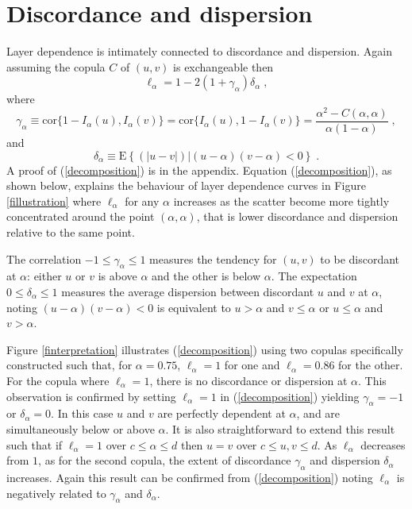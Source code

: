 \documentclass[authoryear]{elsarticle}
\newcommand{\E}{{\mathrm E}}
\newcommand{\cor}{\mathrm{cor}}
\newcommand{\eref}[1]{(\ref{#1})}
\newcommand{\fref}[1]{Figure \ref{#1}}
\begin{document}
\section{Discordance and dispersion}\label{sdecompose}

Layer dependence is intimately connected to discordance and dispersion.
Again assuming the copula $C$ of $(u,v)$ is exchangeable then
\begin{equation}\label{decomposition}
\ell_\alpha = 1-2(1+\gamma_\alpha) \delta_\alpha \;,
\end{equation}
where
$$
\gamma_\alpha \equiv \cor\{1-I_\alpha(u),I_\alpha(v)\} =\cor\{I_\alpha(u),1-I_\alpha(v)\}=\frac{\alpha^2-C(\alpha,\alpha)}{\alpha(1-\alpha)}\;,
$$
and
$$
\delta_\alpha \equiv\E\left\{(|u-v|)|(u-\alpha)(v-\alpha)<0\right\}  \; .
$$
A proof of \eref{decomposition} is  in the appendix. Equation \eref{decomposition}, as shown below, explains the behaviour of layer dependence curves in \fref{fillustration} where $\ell_\alpha$ for any $\alpha$ increases as the scatter become more tightly concentrated  around the point $(\alpha,\alpha)$, that is lower discordance and dispersion relative to the same point.

The correlation $-1\leq\gamma_\alpha\leq 1$ measures the tendency for $(u,v)$ to be discordant at $\alpha$: either $u$ or $v$ is above $\alpha$ and the other is below $\alpha$. The expectation $0\leq \delta_\alpha\leq 1$ measures the average dispersion between discordant $u$ and $v$ at $\alpha$, noting $(u-\alpha)(v-\alpha)<0$ is equivalent to $u>\alpha$ and $v\le\alpha$ or $u\le\alpha$ and $v>\alpha$.


\fref{finterpretation} illustrates \eref{decomposition} using two copulas specifically constructed such that, for $\alpha=0.75$, $\ell_\alpha=1$ for one and $\ell_\alpha=0.86$ for the other. For the copula where $\ell_\alpha=1$, there is no discordance or dispersion at $\alpha$. This observation is confirmed by setting $\ell_\alpha=1$ in \eref{decomposition} yielding $\gamma_\alpha=-1$ or $\delta_\alpha=0$. In this case $u$ and $v$ are perfectly dependent at $\alpha$, and are simultaneously below or above $\alpha$. It is also straightforward to extend this result such that if $\ell_\alpha=1$ over $c\le\alpha\le d$ then $u=v$ over $c\le u,v\le d$. As $\ell_\alpha$ decreases from $1$, as for the second copula, the extent of discordance $\gamma_\alpha$ and dispersion $\delta_\alpha$ increases. Again this result can be confirmed from \eref{decomposition} noting $\ell_\alpha$ is negatively related to $\gamma_\alpha$ and $\delta_\alpha$.
\end{document}
